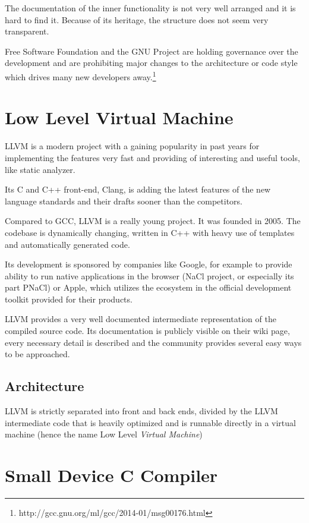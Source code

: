     The documentation of the inner functionality is not very well arranged and it is hard to find it. Because of its heritage, the structure does not seem very transparent.

    Free Software Foundation and the GNU Project are holding governance over the development and are prohibiting major changes to the architecture or code style which drives many new developers away.\footnote{http://gcc.gnu.org/ml/gcc/2014-01/msg00176.html}

    \section{Low Level Virtual Machine}\label{llvm}

    LLVM is a modern project with a gaining popularity in past years for implementing the features very fast and providing of interesting and useful tools, like static analyzer.

    Its C and C++ front-end, Clang, is adding the latest features of the new language standards and their drafts sooner than the competitors.

    Compared to GCC, LLVM is a really young project. It was founded in 2005. The codebase is dynamically changing, written in C++ with heavy use of templates and automatically generated code.\cite{LlvmWeb}

    Its development is sponsored by companies like Google, for example to provide ability to run native applications in the browser (NaCl project, or especially its part PNaCl) or Apple, which utilizes the ecosystem in the official development toolkit provided for their products.\cite{LlvmApple} \cite{LlvmNacl}

    LLVM provides a very well documented intermediate representation of the compiled source code. Its documentation is publicly visible on their wiki page, every necessary detail is described and the community provides several easy ways to be approached.

        \subsection{Architecture}

        LLVM is strictly separated into front and back ends, divided by the LLVM intermediate code that is heavily optimized and is runnable directly in a virtual machine (hence the name Low Level \emph{Virtual Machine})

    \section{Small Device C Compiler}\label{sdcc}

